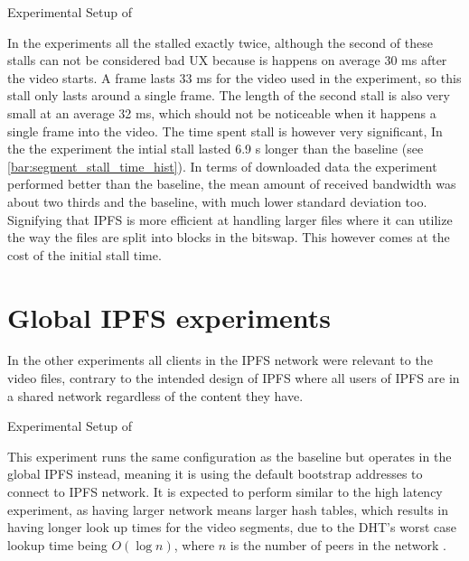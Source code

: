\begin{table}[!htbp]
    \myfloatalign
    \caption[Experimental Setup of Segment size]{Experimental Setup of }
    \label{tab:exp_overview_segment}
    
\end{table}

In the experiments all the stalled exactly twice, although the second of these stalls can not be considered bad \ac{UX} because is happens on average 30 \ac{ms} after the video starts. A frame lasts 33 \ac{ms} for the video used in the experiment, so this stall only lasts around a single frame. The length of the second stall is also very small at an average 32 \ac{ms}, which should not be noticeable when it happens a single frame into the video. The time spent stall is however very significant, In the the experiment the intial stall lasted 6.9 \ac{s} longer than the baseline (see \autoref{bar:segment_stall_time_hist}). In terms of downloaded data the experiment performed better than the baseline, the mean amount of received bandwidth was about two thirds and the baseline, with much lower standard deviation too. Signifying that \ac{IPFS} is more efficient at handling larger files where it can utilize the way the files are split into blocks in the bitswap. This however comes at the cost of the initial stall time.





\FloatBarrier \section{Global IPFS experiments}
\label{sec:eval_global}

In the other experiments all clients in the \ac{IPFS} network were relevant to the video files, contrary to the intended design of \ac{IPFS} where all users of \ac{IPFS} are in a shared network regardless of the content they have.

\begin{table}[!htbp]
    \myfloatalign
    \caption[Experimental Setup of Global \acs{IPFS}]{Experimental Setup of }
    \label{tab:exp_overview_global}
    
\end{table}

This experiment runs the same configuration as the baseline but operates in the global \ac{IPFS} instead, meaning it is using the default bootstrap addresses to connect to \ac{IPFS} network.
It is expected to perform similar to the high latency experiment, as having larger network means larger hash tables, which results in having longer look up times for the video segments, due to the \ac{DHT}'s worst case lookup time being $ O ( \log n)$, where $n$ is the number of peers in the network \cite[p.2]{benet2014ipfs}.


